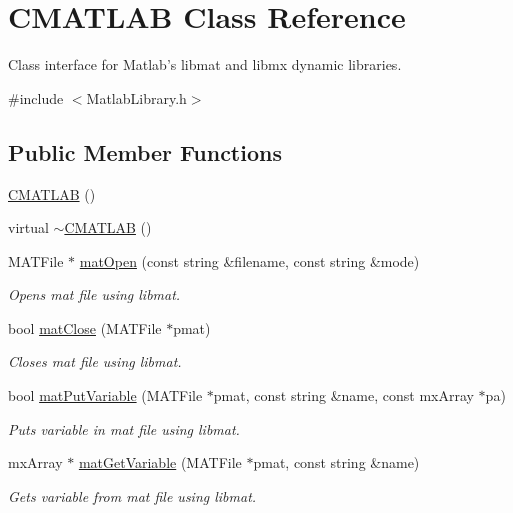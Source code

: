 \hypertarget{class_c_m_a_t_l_a_b}{\section{C\-M\-A\-T\-L\-A\-B Class Reference}
\label{class_c_m_a_t_l_a_b}
}


Class interface for Matlab's libmat and libmx dynamic libraries.  




{\ttfamily \#include $<$Matlab\-Library.\-h$>$}

\subsection*{Public Member Functions}
\begin{DoxyCompactItemize}
\item 
\hyperlink{class_c_m_a_t_l_a_b_a51c832deadf847331f9899fe2461e273}{C\-M\-A\-T\-L\-A\-B} ()
\item 
virtual \hyperlink{class_c_m_a_t_l_a_b_a82542c3ead7ba91c54fe71984ca6eff6}{$\sim$\-C\-M\-A\-T\-L\-A\-B} ()
\item 
M\-A\-T\-File $\ast$ \hyperlink{class_c_m_a_t_l_a_b_a44960abdb1f8e8e9b54d383d25b1db74}{mat\-Open} (const string \&filename, const string \&mode)
\begin{DoxyCompactList}\small\item\em Opens mat file using libmat. \end{DoxyCompactList}\item 
bool \hyperlink{class_c_m_a_t_l_a_b_ab81328a4285d9c2ce96a4da6332ad5ac}{mat\-Close} (M\-A\-T\-File $\ast$pmat)
\begin{DoxyCompactList}\small\item\em Closes mat file using libmat. \end{DoxyCompactList}\item 
bool \hyperlink{class_c_m_a_t_l_a_b_a4adc09552978aa43dd03fcdbdf44b08a}{mat\-Put\-Variable} (M\-A\-T\-File $\ast$pmat, const string \&name, const mx\-Array $\ast$pa)
\begin{DoxyCompactList}\small\item\em Puts variable in mat file using libmat. \end{DoxyCompactList}\item 
mx\-Array $\ast$ \hyperlink{class_c_m_a_t_l_a_b_a5e00c5de6806303393696db2153926dd}{mat\-Get\-Variable} (M\-A\-T\-File $\ast$pmat, const string \&name)
\begin{DoxyCompactList}\small\item\em Gets variable from mat file using libmat. \end{DoxyCompactList}\item 

\end{DoxyCompactItemize}
